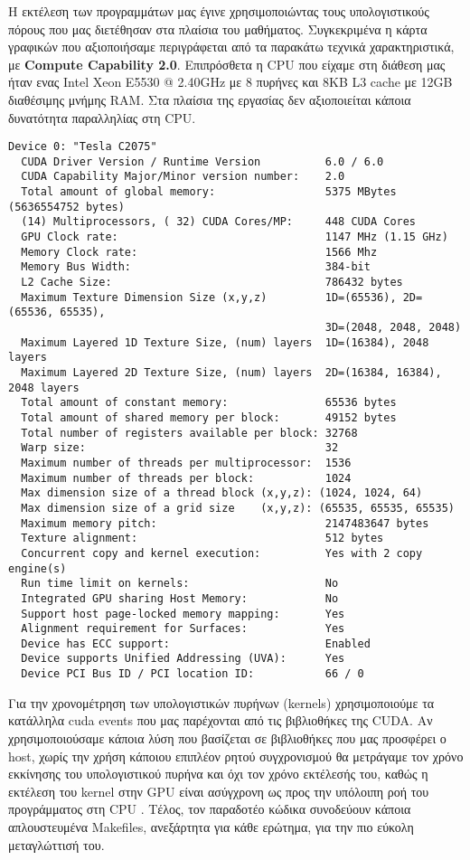 \noindent Η εκτέλεση των προγραμμάτων μας έγινε χρησιμοποιώντας τους υπολογιστικούς πόρους που μας διετέθησαν στα πλαίσια του μαθήματος. Συγκεκριμένα η κάρτα γραφικών που αξιοποιήσαμε περιγράφεται από τα παρακάτω τεχνικά χαρακτηριστικά, με \textbf{Compute Capability 2.0}. Επιπρόσθετα η CPU που είχαμε στη διάθεση μας ήταν ενας Intel Xeon E5530 @ 2.40GHz με 8 πυρήνες και 8KB L3 cache με 12GB διαθέσιμης μνήμης RAM. Στα πλαίσια της εργασίας δεν αξιοποιείται κάποια δυνατότητα παραλληλίας στη CPU.

\begin{verbatim}
Device 0: "Tesla C2075"
  CUDA Driver Version / Runtime Version          6.0 / 6.0
  CUDA Capability Major/Minor version number:    2.0
  Total amount of global memory:                 5375 MBytes (5636554752 bytes)
  (14) Multiprocessors, ( 32) CUDA Cores/MP:     448 CUDA Cores
  GPU Clock rate:                                1147 MHz (1.15 GHz)
  Memory Clock rate:                             1566 Mhz
  Memory Bus Width:                              384-bit
  L2 Cache Size:                                 786432 bytes
  Maximum Texture Dimension Size (x,y,z)         1D=(65536), 2D=(65536, 65535), 
                                                 3D=(2048, 2048, 2048)
  Maximum Layered 1D Texture Size, (num) layers  1D=(16384), 2048 layers
  Maximum Layered 2D Texture Size, (num) layers  2D=(16384, 16384), 2048 layers
  Total amount of constant memory:               65536 bytes
  Total amount of shared memory per block:       49152 bytes
  Total number of registers available per block: 32768
  Warp size:                                     32
  Maximum number of threads per multiprocessor:  1536
  Maximum number of threads per block:           1024
  Max dimension size of a thread block (x,y,z): (1024, 1024, 64)
  Max dimension size of a grid size    (x,y,z): (65535, 65535, 65535)
  Maximum memory pitch:                          2147483647 bytes
  Texture alignment:                             512 bytes
  Concurrent copy and kernel execution:          Yes with 2 copy engine(s)
  Run time limit on kernels:                     No
  Integrated GPU sharing Host Memory:            No
  Support host page-locked memory mapping:       Yes
  Alignment requirement for Surfaces:            Yes
  Device has ECC support:                        Enabled
  Device supports Unified Addressing (UVA):      Yes
  Device PCI Bus ID / PCI location ID:           66 / 0

\end{verbatim}

Για την χρονομέτρηση των υπολογιστικών πυρήνων (kernels) χρησιμοποιούμε τα κατάλληλα cuda events που μας παρέχονται από τις βιβλιοθήκες της CUDA. Αν χρησιμοποιούσαμε κάποια λύση που βασίζεται σε βιβλιοθήκες που μας προσφέρει ο host, χωρίς την χρήση κάποιου επιπλέον ρητού συγχρονισμού θα μετράγαμε τον χρόνο εκκίνησης του υπολογιστικού πυρήνα και όχι τον χρόνο εκτέλεσής του, καθώς η εκτέλεση του kernel στην GPU είναι ασύγχρονη ως προς την υπόλοιπη ροή του προγράμματος στη CPU \cite{Harris:metrics}. Τέλος, τον παραδοτέο κώδικα συνοδεύουν κάποια απλουστευμένα Makefiles, ανεξάρτητα για κάθε ερώτημα, για την πιο εύκολη μεταγλώττισή του.